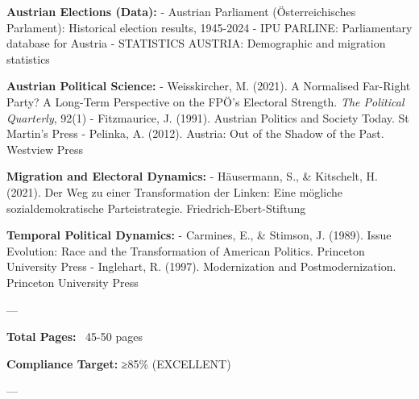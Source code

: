 \textbf{Austrian Elections (Data):}
- Austrian Parliament (Österreichisches Parlament): Historical election results, 1945-2024
- IPU PARLINE: Parliamentary database for Austria
- STATISTICS AUSTRIA: Demographic and migration statistics

\textbf{Austrian Political Science:}
- Weisskircher, M. (2021). A Normalised Far-Right Party? A Long-Term Perspective on the FPÖ's Electoral Strength. \emph{The Political Quarterly}, 92(1)
- Fitzmaurice, J. (1991). Austrian Politics and Society Today. St Martin's Press
- Pelinka, A. (2012). Austria: Out of the Shadow of the Past. Westview Press

\textbf{Migration and Electoral Dynamics:}
- Häusermann, S., \& Kitschelt, H. (2021). Der Weg zu einer Transformation der Linken: Eine mögliche sozialdemokratische Parteistrategie. Friedrich-Ebert-Stiftung

\textbf{Temporal Political Dynamics:}
- Carmines, E., \& Stimson, J. (1989). Issue Evolution: Race and the Transformation of American Politics. Princeton University Press
- Inglehart, R. (1997). Modernization and Postmodernization. Princeton University Press

\nocite{bcm_master}

---

\textbf{Total Pages:} ~45-50 pages

\textbf{Compliance Target:} ≥85\% (EXCELLENT)

---



